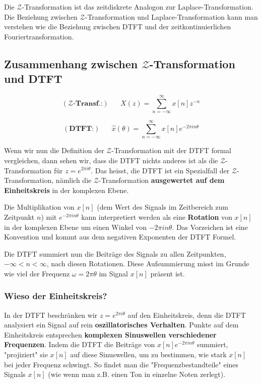 \documentclass[11pt]{article}
\begin{document}
Die $\mathcal{Z}$-Transformation ist das zeitdiskrete Analogon zur Laplace-Transformation. Die Beziehung zwischen $\mathcal{Z}$-Transformation und Laplace-Transformation kann man verstehen wie die Beziehung zwischen DTFT und der zeitkontinuierlichen Fouriertransformation.

\vspace*{-0.5cm}
\subsection*{Zusammenhang zwischen $\mathcal{Z}$-Transformation und DTFT}
\vspace*{-1cm}
\noindent
\begin{minipage}[t]{0.45\textwidth}
    $$(\textbf{$\mathcal{Z}$-Transf.:}) \hspace{20pt} X(z) = \sum_{n=-\infty}^\infty x[n] z^{-n}$$
\end{minipage}
\hfill
\begin{minipage}[t]{0.45\textwidth}
    $$(\textbf{DTFT:}) \hspace{20pt} \hat{x}(\theta) = \sum_{n=-\infty}^\infty x[n] e^{-2 \pi i n \theta}$$
\end{minipage}

Wenn wir nun die Definition der $\mathcal{Z}$-Transformation mit der DTFT formal vergleichen, dann sehen wir, dass die DTFT nichts anderes ist als die $\mathcal{Z}$-Transformation für $z=e^{2\pi i \theta}$. Das heisst, die DTFT ist ein Spezialfall der $\mathcal{Z}$-Transformation, nämlich die $\mathcal{Z}$-Transformation \textbf{ausgewertet auf dem Einheitskreis} in der komplexen Ebene.

Die Multiplikation von $x[n]$ (dem Wert des Signals im Zeitbereich zum Zeitpunkt $n$) mit $e^{-2 \pi i n \theta}$ kann interpretiert werden als eine \textbf{Rotation} von $x[n]$ in der komplexen Ebene um einen Winkel von $-2 \pi i n \theta$. Das Vorzeichen ist eine Konvention und kommt aus dem negativen Exponenten der DTFT Formel.

Die DTFT summiert nun die Beiträge des Signals zu allen Zeitpunkten, $-\infty < n < \infty$, nach diesen Rotationen. Diese Aufsummierung misst im Grunde wie viel der Frequenz $\omega = 2 \pi \theta$ im Signal $x[n]$ präsent ist.

\vspace*{-0.5cm}
\subsubsection*{Wieso der Einheitskreis?}
\vspace*{-0.5cm}
In der DTFT beschränken wir $z = e^{2 \pi i \theta}$ auf den Einheitskreis, denn die DTFT analysiert ein Signal auf rein \textbf{oszillatorisches Verhalten}. Punkte auf dem Einheitskreis entsprechen \textbf{komplexen Sinuswellen verschiedener Frequenzen}. Indem die DTFT die Beiträge von $x[n]e^{-2 \pi i n \theta}$ summiert, "projiziert" sie $x[n]$ auf diese Sinuswellen, um zu bestimmen, wie stark $x[n]$ bei jeder Frequenz schwingt. So findet man die "Frequenzbestandteile" eines Signals $x[n]$ (wie wenn man z.B. einen Ton in einzelne Noten zerlegt).
\end{document}
